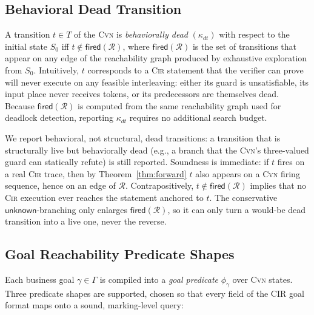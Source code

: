 \documentclass{article}
\begin{document}
\subsection{Behavioral Dead Transition}

A transition $t\in T$ of the \textsc{Cvn} is \emph{behaviorally dead}
$(\kappa_{dt})$ with respect to the initial state $S_0$ iff
$t\notin \mathsf{fired}(\mathcal{R})$, where
$\mathsf{fired}(\mathcal{R})$ is the set of transitions that appear on
any edge of the reachability graph produced by exhaustive exploration
from $S_0$.  Intuitively, $t$ corresponds to a \textsc{Cir} statement
that the verifier can prove will never execute on any feasible
interleaving: either its guard is unsatisfiable, its input place never
receives tokens, or its predecessors are themselves dead.  Because
$\mathsf{fired}(\mathcal{R})$ is computed from the same reachability
graph used for deadlock detection, reporting $\kappa_{dt}$ requires no
additional search budget.

We report behavioral, not structural, dead transitions: a transition
that is structurally live but behaviorally dead (e.g., a branch that
the \textsc{Cvn}'s three-valued guard can statically refute) is still
reported.  Soundness is immediate: if $t$ fires on a real \textsc{Cir}
trace, then by Theorem~\ref{thm:forward} $t$ also appears on a
\textsc{Cvn} firing sequence, hence on an edge of $\mathcal{R}$.
Contrapositively, $t\notin\mathsf{fired}(\mathcal{R})$ implies that no
\textsc{Cir} execution ever reaches the statement anchored to $t$.
The conservative $\mathsf{unknown}$-branching only enlarges
$\mathsf{fired}(\mathcal{R})$, so it can only turn a would-be dead
transition into a live one, never the reverse.

\subsection{Goal Reachability Predicate Shapes}

Each business goal $\gamma\in\Gamma$ is compiled into a \emph{goal
predicate} $\phi_{\gamma}$ over \textsc{Cvn} states.  Three predicate
shapes are supported, chosen so that every field of the CIR goal
format maps onto a sound, marking-level query:
\end{document}
